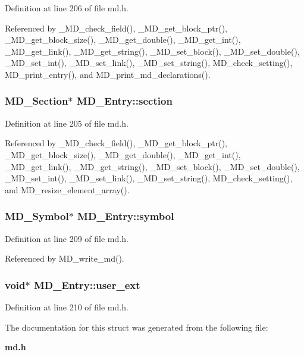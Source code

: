 Definition at line 206 of file md.h.

Referenced by \_\-MD\_\-check\_\-field(), \_\-MD\_\-get\_\-block\_\-ptr(), \_\-MD\_\-get\_\-block\_\-size(), \_\-MD\_\-get\_\-double(), \_\-MD\_\-get\_\-int(), \_\-MD\_\-get\_\-link(), \_\-MD\_\-get\_\-string(), \_\-MD\_\-set\_\-block(), \_\-MD\_\-set\_\-double(), \_\-MD\_\-set\_\-int(), \_\-MD\_\-set\_\-link(), \_\-MD\_\-set\_\-string(), MD\_\-check\_\-setting(), MD\_\-print\_\-entry(), and MD\_\-print\_\-md\_\-declarations().
\subsubsection{\setlength{\rightskip}{0pt plus 5cm}\bf{MD\_\-Section}$\ast$ \bf{MD\_\-Entry::section}}\label{structMD__Entry_6c2e1649225bc303ca11ab958b634e69}




Definition at line 205 of file md.h.

Referenced by \_\-MD\_\-check\_\-field(), \_\-MD\_\-get\_\-block\_\-ptr(), \_\-MD\_\-get\_\-block\_\-size(), \_\-MD\_\-get\_\-double(), \_\-MD\_\-get\_\-int(), \_\-MD\_\-get\_\-link(), \_\-MD\_\-get\_\-string(), \_\-MD\_\-set\_\-block(), \_\-MD\_\-set\_\-double(), \_\-MD\_\-set\_\-int(), \_\-MD\_\-set\_\-link(), \_\-MD\_\-set\_\-string(), MD\_\-check\_\-setting(), and MD\_\-resize\_\-element\_\-array().
\subsubsection{\setlength{\rightskip}{0pt plus 5cm}\bf{MD\_\-Symbol}$\ast$ \bf{MD\_\-Entry::symbol}}\label{structMD__Entry_8f9ad5b1cfe0a5d7e9e08afbfdf17eab}




Definition at line 209 of file md.h.

Referenced by MD\_\-write\_\-md().
\subsubsection{\setlength{\rightskip}{0pt plus 5cm}void$\ast$ \bf{MD\_\-Entry::user\_\-ext}}\label{structMD__Entry_bcdb79a1d72cdf140be100d2030b80af}




Definition at line 210 of file md.h.

The documentation for this struct was generated from the following file:\begin{CompactItemize}
\item 
\bf{md.h}\end{CompactItemize}

